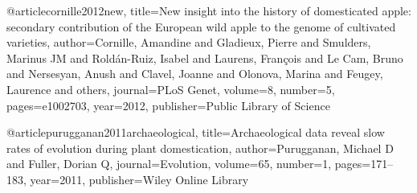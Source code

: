 @article{cornille2012new,
  title={New insight into the history of domesticated apple: secondary contribution of the European wild apple to the genome of cultivated varieties},
  author={Cornille, Amandine and Gladieux, Pierre and Smulders, Marinus JM and Rold{\'a}n-Ruiz, Isabel and Laurens, Fran{\c{c}}ois and Le Cam, Bruno and Nersesyan, Anush and Clavel, Joanne and Olonova, Marina and Feugey, Laurence and others},
  journal={PLoS Genet},
  volume={8},
  number={5},
  pages={e1002703},
  year={2012},
  publisher={Public Library of Science}
}

@article{purugganan2011archaeological,
  title={Archaeological data reveal slow rates of evolution during plant domestication},
  author={Purugganan, Michael D and Fuller, Dorian Q},
  journal={Evolution},
  volume={65},
  number={1},
  pages={171--183},
  year={2011},
  publisher={Wiley Online Library}
}
